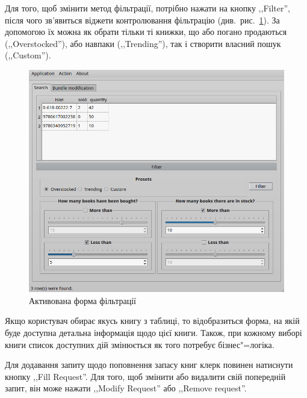 \documentclass[a4paper,notitlepage,headsepline,pdftex,oneside]{report}
\begin{document}
    Для того, щоб змінити метод фільтрації, потрібно нажати на кнопку
    ,,Filter'', після чого зв’явиться віджети контролювання фільтрацію
    (див.~рис.~\ref{fig:filter}).
    За допомогою їх можна як обрати тільки ті книжки, що або погано продаються
    (,,Overstocked''), або навпаки (,,Trending''), так і створити власний
    пошук (,,Custom'').
    \begin{figure}[h]
      \centering
      \includegraphics[width=\textwidth]{filter.png}
      \caption{Активована форма фільтрації}
      \label{fig:filter}
    \end{figure}

    Якщо користувач обирає якусь книгу з таблиці, то відобразиться форма, на
    якій буде доступна детальна інформація щодо цієї книги.
    Також, при кожному виборі книги список доступних дій змінюється як того
    потребує бізнес"=логіка.

    Для додавання запиту щодо поповнення запасу книг клерк повинен натиснути
    кнопку ,,Fill Request''.
    Для того, щоб змінити або видалити свій попередній запит, він може нажати
    ,,Modify Request'' або ,,Remove request''.
\end{document}
